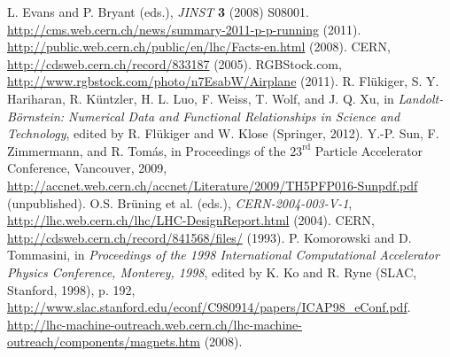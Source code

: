 \documentclass[12pt, letterpaper]{report}
\begin{document}
\begin{thebibliography}{99}

 L. Evans and P. Bryant (eds.), \textit{JINST} \textbf{3} (2008) S08001.
 \url{http://cms.web.cern.ch/news/summary-2011-p-p-running} (2011).
 \url{http://public.web.cern.ch/public/en/lhc/Facts-en.html} (2008).
 CERN, \url{http://cdsweb.cern.ch/record/833187} (2005).
 RGBStock.com, \url{http://www.rgbstock.com/photo/n7EsabW/Airplane} (2011).
 R. Fl\"{u}kiger, S. Y. Hariharan, R. K\"{u}ntzler, H. L. Luo, F. Weiss, T. Wolf, and J. Q. Xu, in \textit{Landolt-B\"{o}rnstein: Numerical Data and Functional Relationships in Science and Technology}, edited by R. Fl\"{u}kiger and W. Klose (Springer, 2012).
 Y.-P. Sun, F. Zimmermann, and R. Tom\'{a}s, in Proceedings of the $23^{\mathrm{rd}}$ Particle Accelerator Conference, Vancouver, 2009, \url{http://accnet.web.cern.ch/accnet/Literature/2009/TH5PFP016-Sunpdf.pdf} (unpublished).
 O.S. Br\"{u}ning et al. (eds.), \textit{CERN-2004-003-V-1}, \url{http://lhc.web.cern.ch/lhc/LHC-DesignReport.html} (2004).
 CERN, \url{http://cdsweb.cern.ch/record/841568/files/} (1993).
 P. Komorowski and D. Tommasini, in \textit{Proceedings of the 1998 International Computational Accelerator Physics Conference, Monterey, 1998}, edited by K. Ko and R. Ryne (SLAC, Stanford, 1998), p. 192, \url{http://www.slac.stanford.edu/econf/C980914/papers/ICAP98_eConf.pdf}.
 \url{http://lhc-machine-outreach.web.cern.ch/lhc-machine-outreach/components/magnets.htm} (2008).



\end{thebibliography}
\end{document}
